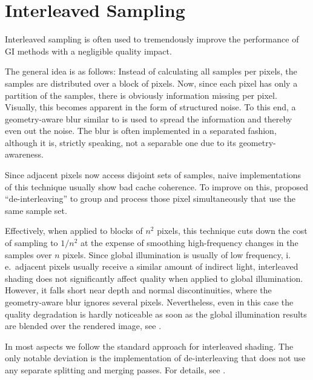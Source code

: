 \section{Interleaved Sampling}
\label{sec:concept:interleavedSampling}
Interleaved sampling \citep{Keller:2001:InterleavedSampling} is often used to tremendously improve the performance of GI methods with a negligible quality impact.

The general idea is as follows: Instead of calculating all samples per pixels, the samples are distributed over a block of pixels. Now, since each pixel has only a partition of the samples, there is obviously information missing per pixel. Visually, this becomes apparent in the form of structured noise. To this end, a geometry-aware blur similar to \citet{laine2007incremental} is used to spread the information and thereby even out the noise. The blur is often implemented in a separated fashion, although it is, strictly speaking, not a separable one due to its geometry-awareness.

Since adjacent pixels now access disjoint sets of samples, naive implementations of this technique usually show bad cache coherence. To improve on this, \citet{segovia2006non} proposed ``de-interleaving'' to group and process those pixel simultaneously that use the same sample set.

Effectively, when applied to blocks of $n^2$ pixels, this technique cuts down the cost of sampling to $ 1 / n^2 $ at the expense of smoothing high-frequency changes in the samples over $n$ pixels. Since global illumination is usually of low frequency, i.\,e.\ adjacent pixels usually receive a similar amount of indirect light, interleaved shading does not significantly affect quality when applied to global illumination. However, it falls short near depth and normal discontinuities, where the geometry-aware blur ignores several pixels. Nevertheless, even in this case the quality degradation is hardly noticeable as soon as the global illumination results are blended over the rendered image, see .

In most aspects we follow the standard approach for interleaved shading. The only notable deviation is the implementation of de-interleaving that does not use any separate splitting and merging passes. For details, see .
